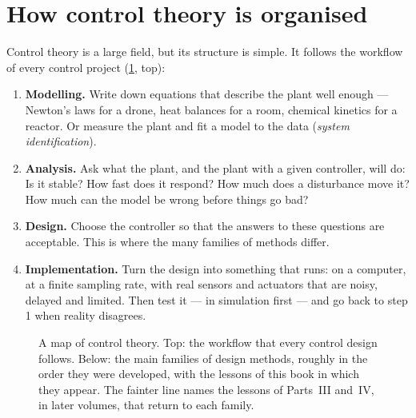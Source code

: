 \section{How control theory is organised}

Control theory is a large field, but its structure is simple. It follows the workflow of every control project (\cref{fig:intro-map}, top):
\begin{enumerate}
  \item \textbf{Modelling.} Write down equations that describe the plant well enough — Newton's laws for a drone, heat balances for a room, chemical kinetics for a reactor. Or measure the plant and fit a model to the data (\emph{system identification}).
  \item \textbf{Analysis.} Ask what the plant, and the plant with a given controller, will do: Is it stable? How fast does it respond? How much does a disturbance move it? How much can the model be wrong before things go bad?
  \item \textbf{Design.} Choose the controller so that the answers to these questions are acceptable. This is where the many families of methods differ.
  \item \textbf{Implementation.} Turn the design into something that runs: on a computer, at a finite sampling rate, with real sensors and actuators that are noisy, delayed and limited. Then test it — in simulation first — and go back to step 1 when reality disagrees.
\end{enumerate}

\begin{figure}[t]
\begin{fullwidth}
  \centering
  \caption{A map of control theory. Top: the workflow that every control design follows. Below: the main families of design methods, roughly in the order they were developed, with the lessons of this book in which they appear. The fainter line names the lessons of Parts~III and~IV, in later volumes, that return to each family.}
  \label{fig:intro-map}
\end{fullwidth}
\end{figure}

